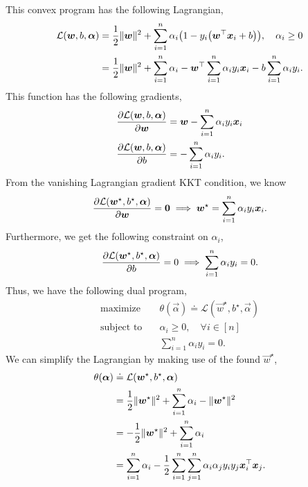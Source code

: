This convex program has the following Lagrangian,
\begin{align*}
    \mathcal{L}(\vec{w}, b, \vec{\alpha}) & = \frac{1}{2} \| \vec{w} \|^2 + \sum_{i=1}^{n} \alpha_i \lft( 1 - y_i \lft( \transpose{\vec{w}} \vec{x}_i + b \rgt) \rgt), \quad \alpha_i \geq 0     \\
                                          & = \frac{1}{2} \| \vec{w} \|^2 + \sum_{i=1}^{n} \alpha_i - \transpose{\vec{w}} \sum_{i=1}^{n} \alpha_i y_i \vec{x}_i - b \sum_{i=1}^{n} \alpha_i y_i.
\end{align*}
This function has the following gradients,
\begin{align*}
    \pdv{\mathcal{L}(\bm{w}, b, \bm{\alpha})}{\bm{w}} & = \bm{w} - \sum_{i=1}^{n} \alpha_i y_i \bm{x}_i \\
    \pdv{\mathcal{L}(\bm{w}, b, \bm{\alpha})}{b}       & = - \sum_{i=1}^{n} \alpha_i y_i.
\end{align*}
From the vanishing Lagrangian gradient KKT condition, we know \[
    \pdv{\mathcal{L}(\bm{w}^\star, b^\star, \bm{\alpha})}{\bm{w}} = \bm{0} \implies \bm{w}^\star = \sum_{i=1}^{n} \alpha_i y_i \bm{x}_i.
\]
Furthermore, we get the following constraint on $\alpha_i$, \[
    \pdv{\mathcal{L}(\bm{w}^\star, b^\star, \bm{\alpha})}{b} = 0 \implies \sum_{i=1}^{n} \alpha_i y_i = 0.
\]
Thus, we have the following dual program,
\begin{align*}
    \text{maximize}   & \quad \theta(\vec{\alpha}) \doteq \mathcal{L}(\vec{w}^\star, b^\star, \vec{\alpha}) \\
    \text{subject to} & \quad \alpha_i \geq 0, \quad \forall i \in [n]                                      \\
                      & \quad \sum_{i=1}^{n} \alpha_i y_i = 0.
\end{align*}
We can simplify the Lagrangian by making use of the found $\vec{w}^\star$,
\begin{align*}
    \theta(\bm{\alpha}) & \doteq \mathcal{L}(\bm{w}^\star, b^\star, \bm{\alpha})                                                                         \\
                         & = \frac{1}{2} \| \bm{w}^\star \|^2 + \sum_{i=1}^{n} \alpha_i - \| \bm{w}^\star \|^2                                            \\
                         & = -\frac{1}{2} \| \bm{w}^\star \|^2 + \sum_{i=1}^{n} \alpha_i                                                                   \\
                         & = \sum_{i=1}^{n} \alpha_i - \frac{1}{2} \sum_{i=1}^{n} \sum_{j=1}^{n} \alpha_i \alpha_j y_i y_j \bm{x}_i^\top \bm{x}_j.
\end{align*}
